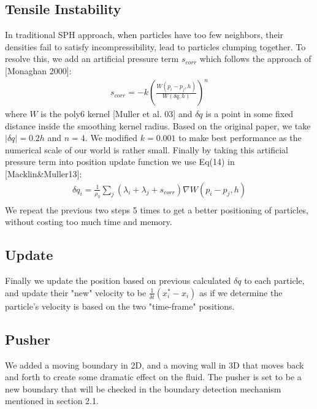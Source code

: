 \documentclass[sigconf]{acmart}
\begin{document}
\subsection{Tensile Instability}
In traditional SPH approach, when particles have too few neighbors, their densities fail to satisfy incompressibility, lead to particles clumping together. To resolve this, we add an artificial pressure term $s_{corr}$ which follows the approach of [Monaghan 2000]:
\begin{align*}
    s_{corr} = -k(\frac{W(p_i-p_j, h)}{W(\delta q, h)})^n
\end{align*}
where $W$ is the poly6 kernel [Muller et al. 03] and $\delta q$ is a point in some fixed distance inside the smoothing kernel radius. Based on the original paper, we take $|\delta q| = 0.2 h$ and $n=4$. We modified $k=0.001$ to make best performance as the numerical scale of our world is rather small. Finally by taking this artificial pressure term into position update function we use Eq(14) in [Macklin\&Muller13]:
\begin{align*}
    \delta q_i = \frac{1}{\rho_0}\sum_j(\lambda_i + \lambda_j + s_{corr})\nabla W(p_i-p_j, h)\\
\end{align*}
We repeat the previous two steps 5 times to get a better positioning of particles, without costing too much time and memory.

\subsection{Update}
Finally we update the position based on previous calculated $\delta q$ to each particle, and update their "new" velocity to be $\frac{1}{\delta t}(x_i^* - x_i)$ as if we determine the particle's velocity is based on the two "time-frame" positions.

\subsection{Pusher}
We added a moving boundary in 2D, and a moving wall in 3D that moves back and forth to create some dramatic effect on the fluid. The pusher is set to be a new boundary that will be checked in the boundary detection mechanism mentioned in section 2.1.
\end{document}
